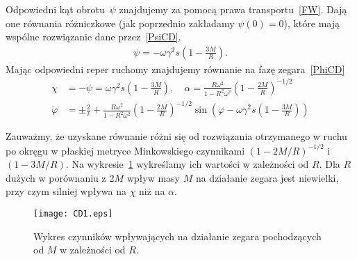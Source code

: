 Odpowiedni kąt obrotu~$\psi$ znajdujemy za pomocą prawa transportu~\eqref{FW}.
Dają one równania różniczkowe (jak poprzednio zakładamy $\psi(0)=0$), 
które mają wspólne rozwiązanie dane przez~\eqref{PsiCD}.
\begin{align}\label{PsiCD}
\psi = - \omega \gamma^2 s \left( 1-\frac{3M}{R} \right).
\end{align}
Mając odpowiedni reper ruchomy znajdujemy równanie na 
fazę zegara~\eqref{PhiCD}
\begin{align}\nonumber
\chi &= - \psi =\omega \gamma^2 s \left( 1-\frac{3M}{R} \right)
 , \quad 
\alpha =  \frac{R\omega^2}{1-R^2\omega^2} 
\left( 1-\frac{2M}{R} \right)^{-1/2}
\\
\dot{\varphi} &= \pm \frac{2}{\ell} + \label{PsiCD}
\frac{R\omega^2}{1-R^2\omega^2} 
\left( 1-\frac{2M}{R} \right)^{-1/2}\sin \left(\varphi - 
\omega \gamma^2 s \left( 1-\frac{3M}{R} \right)
 \right)
\end{align}

Zauważmy, że uzyskane równanie różni się od rozwiązania 
otrzymanego w ruchu po okręgu w 
płaskiej metryce Minkowskiego czynnikami
$\left( 1-2M/R \right)^{-1/2}$ i 
$ \left( 1-3M/R \right)$. Na wykresie~\ref{CD1plot} wykreślamy
 ich wartości w zależności od $R$. Dla $R$ dużych w porównaniu z 
$2M$ wpływ masy $M$ na działanie zegara jest niewielki, 
przy czym silniej wpływa na $\chi$ niż na $\alpha$.  
\begin{figure}
\centering
\texttt{[image: CD1.eps]}
\caption{Wykres czynników wpływających na działanie zegara 
pochodzących od $M$ w zależności od $R$.}{\label{CD1plot}}
\end{figure}

